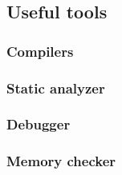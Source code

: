 \subsection[Tools]{Useful tools}
\subsubsection{Compilers}
\subsubsection{Static analyzer}
\subsubsection{Debugger}
\subsubsection{Memory checker}
